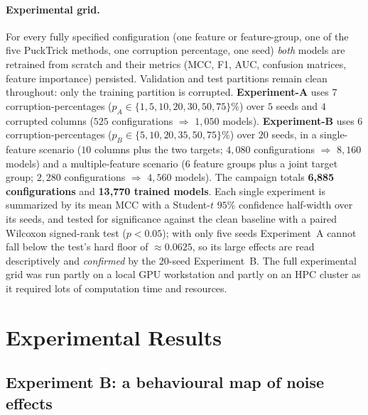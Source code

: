 \documentclass[a4paper, 9pt]{extarticle}
\begin{document}
\paragraph{Experimental grid.}
For every fully specified configuration (one feature or feature-group, one of the five PuckTrick methods, one corruption percentage, one seed) \emph{both} models are retrained from scratch and their metrics (MCC, F1, AUC, confusion matrices, feature importance) persisted. Validation and test partitions remain clean throughout: only the training partition is corrupted. \textbf{Experiment-A} uses 7 corruption-percentages ($p_A\in\{1,5,10,20,30,50,75\}\%$) over $5$ seeds and $4$ corrupted columns ($525$ configurations $\Rightarrow$ $1{,}050$ models). \textbf{Experiment-B} uses 6 corruption-percentages ($p_B\in\{5,10,20,35,50,75\}\%$) over $20$ seeds, in a single-feature scenario ($10$ columns plus the two targets; $4{,}080$ configurations $\Rightarrow$ $8{,}160$ models) and a multiple-feature scenario ($6$ feature groups plus a joint target group; $2{,}280$ configurations $\Rightarrow$ $4{,}560$ models).
The campaign totals \textbf{6{,}885 configurations} and \textbf{13{,}770 trained
models}. Each single experiment is summarized by its mean MCC with a Student-$t$ $95\%$ confidence half-width over its seeds, and tested for significance against the clean baseline with a paired Wilcoxon signed-rank test ($p<0.05$); with only five seeds Experiment~A cannot fall below the test's hard floor of $\approx 0.0625$, so its large effects are read descriptively and \emph{confirmed} by the 20-seed Experiment~B. The full experimental grid was run partly on a local GPU workstation and partly on an HPC cluster as it required lots of computation time and resources.

\section{Experimental Results}

\subsection{Experiment B: a behavioural map of noise effects}
\end{document}
